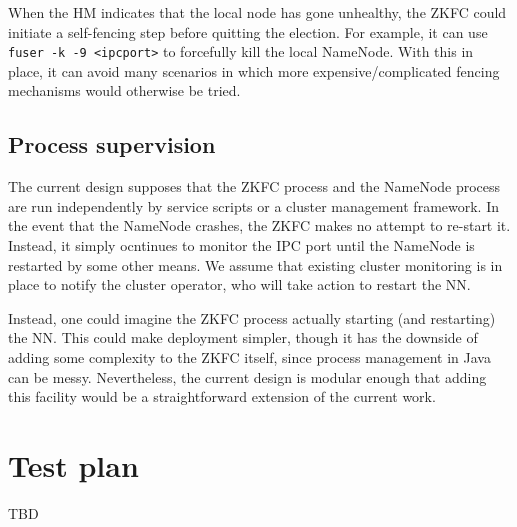 \documentclass{article}
\begin{document}
When the HM indicates that the local node has gone unhealthy, the ZKFC could initiate a self-fencing step before quitting the election. For example, it can use {\tt fuser -k -9 <ipcport>} to forcefully kill the local NameNode. With this in place, it can avoid many scenarios in which more expensive/complicated fencing mechanisms would otherwise be tried.

\subsection{Process supervision}
The current design supposes that the ZKFC process and the NameNode process are run independently by service scripts or a cluster management framework. In the event that the NameNode crashes, the ZKFC makes no attempt to re-start it. Instead, it simply ocntinues to monitor the IPC port until the NameNode is restarted by some other means. We assume that existing cluster monitoring is in place to notify the cluster operator, who will take action to restart the NN.

Instead, one could imagine the ZKFC process actually starting (and restarting) the NN. This could make deployment simpler, though it has the downside of adding some complexity to the ZKFC itself, since process management in Java can be messy. Nevertheless, the current design is modular enough that adding this facility would be a  straightforward extension of the current work.

\section{Test plan}

TBD
\end{document}
